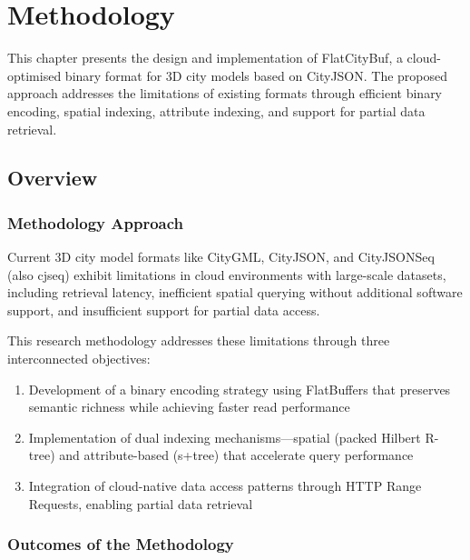 
\chapter{Methodology}
\label{methodology}

This chapter presents the design and implementation of FlatCityBuf, a cloud-optimised binary format for 3D city models based on CityJSON. The proposed approach addresses the limitations of existing formats through efficient binary encoding, spatial indexing, attribute indexing, and support for partial data retrieval.

\section{Overview}
\label{methodology:overview}

\subsection{Methodology Approach}
\label{methodology:overview:approach}

Current 3D city model formats like CityGML, CityJSON, and CityJSONSeq (also \ac{cjseq}) exhibit limitations in cloud environments with large-scale datasets, including retrieval latency, inefficient spatial querying without additional software support, and insufficient support for partial data access.

This research methodology addresses these limitations through three interconnected objectives:

\begin{enumerate}
  \item Development of a binary encoding strategy using FlatBuffers that preserves semantic richness while achieving faster read performance
  \item Implementation of dual indexing mechanisms—spatial (packed Hilbert R-tree) and attribute-based (\ac{s+tree}) that accelerate query performance
  \item Integration of cloud-native data access patterns through HTTP Range Requests, enabling partial data retrieval
\end{enumerate}

\subsection{Outcomes of the Methodology}
\label{methodology:overview:outcomes}


